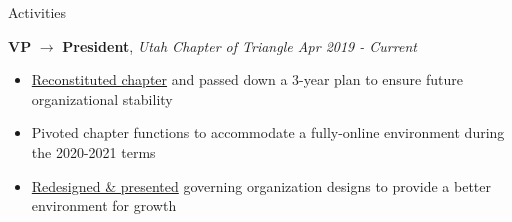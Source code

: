 \documentclass{resume/resume}
\begin{document}
\begin{rSection}{Activities}

    {\bf VP} $\rightarrow$ {\bf President}, {\em Utah Chapter of Triangle \hfill Apr 2019 - Current}
    \vspace{-6pt}
    \begin{itemize}[nosep]
        \item \href{https://github.com/Spelkington/triangle/blob/master/Laws/Constitution.md}{Reconstituted chapter} and passed down a 3-year plan to ensure future organizational stability
        \item Pivoted chapter functions to accommodate a fully-online environment during the 2020-2021 terms
        \item \href{https://github.com/UtahTriangle/Laws/blob/main/Proposals/IGC/The%20Independent%20Greek%20Council.pdf}{Redesigned \& presented} governing organization designs to provide a better environment for growth
    \end{itemize}
    
    

    

\end{rSection}
\end{document}
